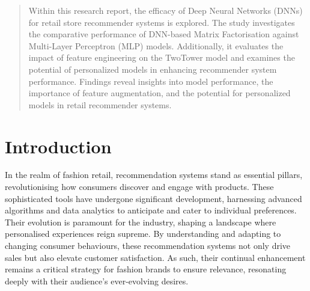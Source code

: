 \documentclass[conference,compsoc]{IEEEtran}
\begin{document}
\maketitle

\begin{abstract}
Within this research report, the efficacy of Deep Neural Networks (DNNs) for retail store recommender systems is explored. The study investigates the comparative performance of DNN-based Matrix Factorisation against Multi-Layer Perceptron (MLP) models. Additionally, it evaluates the impact of feature engineering on the TwoTower model and examines the potential of personalized models in enhancing recommender system performance. Findings reveal insights into model performance, the importance of feature augmentation, and the potential for personalized models in retail recommender systems.
\end{abstract}





%
\IEEEpeerreviewmaketitle


\section{Introduction}
In the realm of fashion retail, recommendation systems stand as essential pillars, revolutionising how consumers discover and engage with products. These sophisticated tools have undergone significant development, harnessing advanced algorithms and data analytics to anticipate and cater to individual preferences. Their evolution is paramount for the industry, shaping a landscape where personalised experiences reign supreme. By understanding and adapting to changing consumer behaviours, these recommendation systems not only drive sales but also elevate customer satisfaction. As such, their continual enhancement remains a critical strategy for fashion brands to ensure relevance, resonating deeply with their audience's ever-evolving desires.
\end{document}
